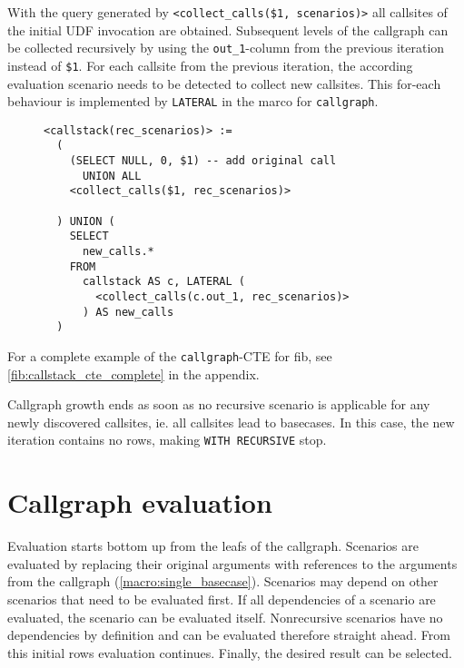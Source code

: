 With the query generated by \texttt{<collect\_calls(\$1, scenarios)>} all callsites of the initial UDF invocation are obtained. Subsequent levels of the callgraph can be collected recursively by using the \texttt{out\_1}-column from the previous iteration instead of \texttt{\$1}. For each callsite from the previous iteration, the according evaluation scenario needs to be detected to collect new callsites. This for-each behaviour is implemented by \texttt{LATERAL} in the marco for \texttt{callgraph}.

\begin{figure}[h!]\centering
\begin{verbatim}
<callstack(rec_scenarios)> :=
  (
    (SELECT NULL, 0, $1) -- add original call
      UNION ALL
    <collect_calls($1, rec_scenarios)> 

  ) UNION (
    SELECT
      new_calls.*
    FROM
      callstack AS c, LATERAL (
        <collect_calls(c.out_1, rec_scenarios)>
      ) AS new_calls
  )
\end{verbatim}
  \caption{}
  \label{}
\end{figure}

For a complete example of the \texttt{callgraph}-CTE for fib, see \autoref{fib:callstack_cte_complete} in the appendix.

Callgraph growth ends as soon as no recursive scenario is applicable for any newly discovered callsites, ie. all callsites lead to basecases. In this case, the new iteration contains no rows, making \texttt{WITH RECURSIVE} stop.

\section{Callgraph evaluation}
Evaluation starts bottom up from the leafs of the callgraph. Scenarios are evaluated by replacing their original arguments with references to the arguments from the callgraph (\autoref{macro:single_basecase}). Scenarios may depend on other scenarios that need to be evaluated first. If all dependencies of a scenario are evaluated, the scenario can be evaluated itself. Nonrecursive scenarios have no dependencies by definition and can be evaluated therefore straight ahead. From this initial rows evaluation continues. Finally, the desired result can be selected.


